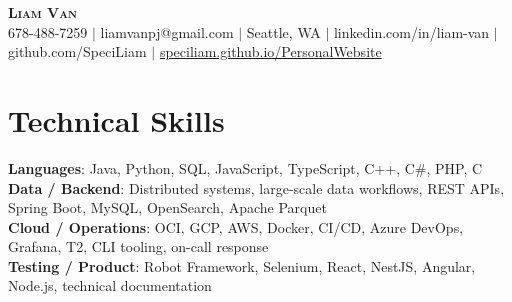 \documentclass[letterpaper,11pt]{article}
\begin{document}

%
\begin{center}
    \textbf{\Huge \scshape Liam Van} \\ \vspace{1pt}
    \small 678-488-7259 $|$ \small {liamvanpj@gmail.com} $|$ Seattle, WA
 {{$|$ linkedin.com/in/liam-van} {$|$ github.com/SpeciLiam} {$|$ \href{https://speciliam.github.io/PersonalWebsite}{speciliam.github.io/PersonalWebsite}}}

\end{center}

\section{Technical Skills}
 \begin{itemize}[leftmargin=0.15in, label={}]
    \small{\item{
     \textbf{Languages}{: Java, Python, SQL, JavaScript, TypeScript, C++, C\#, PHP, C} \\
     \textbf{Data / Backend}{: Distributed systems, large-scale data workflows, REST APIs, Spring Boot, MySQL, OpenSearch, Apache Parquet} \\
     \textbf{Cloud / Operations}{: OCI, GCP, AWS, Docker, CI/CD, Azure DevOps, Grafana, T2, CLI tooling, on-call response} \\
     \textbf{Testing / Product}{: Robot Framework, Selenium, React, NestJS, Angular, Node.js, technical documentation} \\
    }}
 \end{itemize}
%
\end{document}
